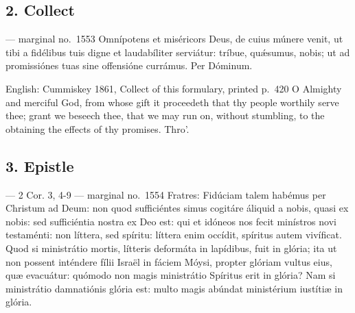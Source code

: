 \elementguard
\subsection*{2. Collect }

\begin{appointedlatin}{ --- marginal no.\ 1553}
Omnípotens et miséricors Deus, de cuius múnere venit, ut tibi a fidélibus tuis
digne et laudabíliter serviátur: tríbue, quǽsumus, nobis; ut ad promissiónes
tuas sine offensióne currámus. Per Dóminum.
\end{appointedlatin}

\begin{namedtranslation}{English: Cummiskey 1861, Collect of this formulary, printed p.\ 420}
O Almighty and merciful God, from whose gift it proceedeth that thy people
worthily serve thee; grant we beseech thee, that we may run on, without
stumbling, to the obtaining the effects of thy promises. Thro'.
\end{namedtranslation}


\elementguard
\subsection*{3. Epistle }

\begin{appointedlatin}{ --- 2 Cor. 3, 4-9 --- marginal no.\ 1554}
Fratres: Fidúciam talem habémus per Christum ad Deum: non quod sufficiéntes
simus cogitáre áliquid a nobis, quasi ex nobis: sed sufficiéntia nostra ex Deo
est: qui et idóneos nos fecit minístros novi testaménti: non líttera, sed
spíritu: líttera enim occídit, spíritus autem vivíficat. Quod si ministrátio
mortis, lítteris deformáta in lapídibus, fuit in glória; ita ut non possent
inténdere fílii Israël in fáciem Móysi, propter glóriam vultus eius, quæ
evacuátur: quómodo non magis ministrátio Spíritus erit in glória? Nam si
ministrátio damnatiónis glória est: multo magis abúndat ministérium iustítiæ
in glória.
\end{appointedlatin}

